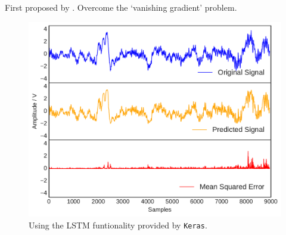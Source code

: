 First proposed by \cite{Hochreiter:1997:LSM:1246443.1246450}. Overcome the `vanishing gradient' problem. 
\begin{figure}[t]
    \includegraphics[width=1.0\textwidth]{fig/neuralnetwork.pdf}
    \caption[Neural Network]{Using the LSTM funtionality provided by \texttt{Keras}.}
    \label{fig:kmeanerror}
\end{figure}
